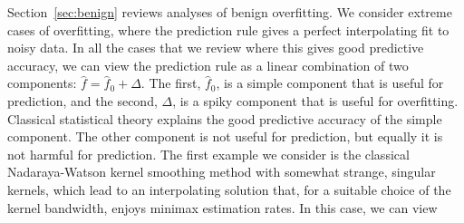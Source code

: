 Section~\ref{sec:benign} reviews analyses of benign overfitting. We consider extreme cases of overfitting, where the prediction rule gives a perfect interpolating fit to noisy data. In all the cases that we review where this gives good predictive accuracy, we can view the prediction rule as a linear combination of two components: $\widehat f=\widehat f_0+\Delta$. The first, $\widehat f_0$, is a simple component that is useful for prediction, and the second,
$\Delta$, is a spiky component that is useful for overfitting. Classical statistical theory explains the good predictive accuracy of the simple component. The other component is not useful for prediction, but equally it is not harmful for prediction.  The first example we consider is the classical Nadaraya-Watson kernel smoothing method with somewhat strange, singular kernels, which lead to an interpolating solution that, for a suitable choice of the kernel bandwidth, enjoys minimax estimation rates. In this case, we can view
